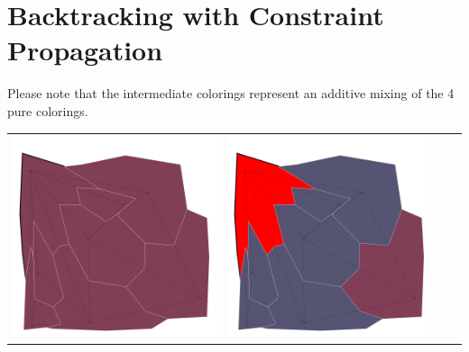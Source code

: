 \documentclass[10pt,a4paper]{article}
\begin{document}
\section{Backtracking with Constraint Propagation}
Please note that the intermediate colorings represent an additive mixing of the 4 pure colorings.\\
\begin{tabular}{c c c c }
	\includegraphics[scale=.10]{../results/backtracking_mac/map_build/bt_mac_I00001.pdf}&
	\includegraphics[scale=.10]{../results/backtracking_mac/map_build/bt_mac_I00002.pdf}&

\end{tabular}
\end{document}
